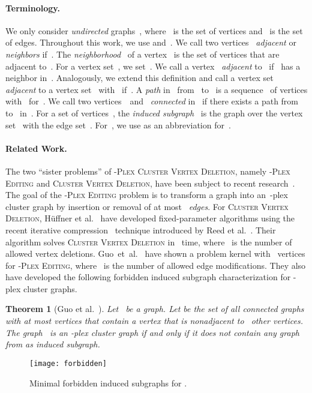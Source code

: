 \documentclass[12pt, a4paper, abstracton]{scrreprt}
\renewcommand{\cite}{~\citep}
\newcommand{\name}{\textsc}
\newcommand{\pvd}[1]{\name{\mbox{-Plex} Cluster Vertex Deletion}}
\newcommand{\cvd}{\name{Cluster Vertex Deletion}}
\newcommand{\pl}[1]{\mbox{-plex}}
\newcommand{\pcg}[1]{\pl #1 cluster graph}
\newcounter{theorem}
\newtheorem{satz}{Theorem}[chapter]
\theoremstyle{definition}
\theoremstyle{remark}
\begin{document}
\paragraph{Terminology.}
\label{sec:prelim}
We only consider \emph{undirected} graphs~, where~ is the set of vertices and~ is the set of edges. Throughout this work, we use  and~. We call two vertices~ \emph{adjacent} or \emph{neighbors} if~. The \emph{neighborhood}~ of a vertex~ is the set of vertices that are adjacent to~.  For a vertex set~, we set~. We call a vertex~ \emph{adjacent} to~ if ~has a neighbor in~. Analogously, we extend this definition and call a vertex set~ \emph{adjacent} to a vertex set~ with~ if~. A \emph{path} in~ from~ to~ is a sequence~ of vertices with~ for~. We call two vertices~~and~ \emph{connected} in~ if there exists a path from~ to~ in~.  For a set of vertices~, the \emph{induced subgraph}~ is the graph over the vertex set~ with the edge set~.  For~, we use  as an abbreviation for~.

\paragraph{Related Work.}
The two ``sister problems'' of \pvd s, namely \name{-Plex Editing} and \cvd, have been subject to recent research\cite{DBLP:conf/aaim/GuoKNU09,HKMN09TOCS}. The goal of the \name{-Plex Editing} problem is to transform a graph into an~-plex cluster graph by insertion or removal of at most ~\emph{edges}. For \cvd, Hüffner et al.\cite{ HKMN09TOCS} have developed fixed-parameter algorithms using the recent iterative compression\cite{GMN2009} technique introduced by Reed et al.\cite{RSV04}. Their algorithm solves \cvd{} in ~time, where~ is the number of allowed vertex deletions.  Guo~et~al.\cite{DBLP:conf/aaim/GuoKNU09} have shown a problem kernel with ~vertices for \name{-Plex Editing}, where~ is the number of allowed edge modifications. They also have developed the following forbidden induced subgraph characterization for \pcg ss.

\begin{satz}[Guo et al.\cite{DBLP:conf/aaim/GuoKNU09}]\label{fisg-char}
  Let~ be a graph. Let  be the set of all connected graphs with at most  vertices that contain a vertex that is nonadjacent to~ other vertices. The graph~ is an \pcg s if and only if it does not contain any graph from  as induced subgraph.
\end{satz}
\begin{figure}
  \centering
    \texttt{[image: forbidden]}
    \caption{Minimal forbidden induced subgraphs for .}
  \label{forbidden}
\end{figure}
\end{document}
